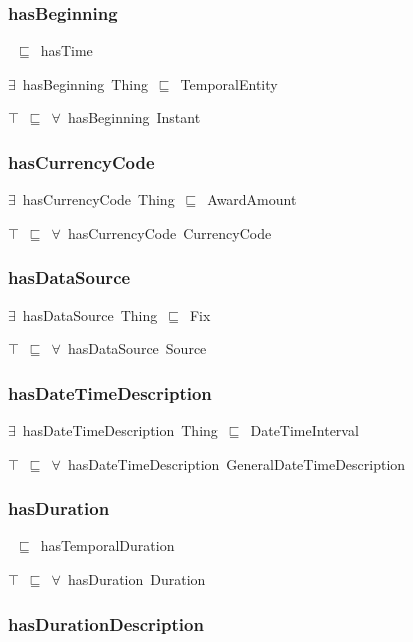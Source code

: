 \documentclass{article}
\begin{document}
\subsubsection*{hasBeginning}

~\ensuremath{\sqsubseteq}~hasTime

\ensuremath{\exists}~hasBeginning~Thing~\ensuremath{\sqsubseteq}~TemporalEntity

\ensuremath{\top}~\ensuremath{\sqsubseteq}~\ensuremath{\forall}~hasBeginning~Instant

\subsubsection*{hasCurrencyCode}

\ensuremath{\exists}~hasCurrencyCode~Thing~\ensuremath{\sqsubseteq}~AwardAmount

\ensuremath{\top}~\ensuremath{\sqsubseteq}~\ensuremath{\forall}~hasCurrencyCode~CurrencyCode

\subsubsection*{hasDataSource}

\ensuremath{\exists}~hasDataSource~Thing~\ensuremath{\sqsubseteq}~Fix

\ensuremath{\top}~\ensuremath{\sqsubseteq}~\ensuremath{\forall}~hasDataSource~Source

\subsubsection*{hasDateTimeDescription}

\ensuremath{\exists}~hasDateTimeDescription~Thing~\ensuremath{\sqsubseteq}~DateTimeInterval

\ensuremath{\top}~\ensuremath{\sqsubseteq}~\ensuremath{\forall}~hasDateTimeDescription~GeneralDateTimeDescription

\subsubsection*{hasDuration}

~\ensuremath{\sqsubseteq}~hasTemporalDuration

\ensuremath{\top}~\ensuremath{\sqsubseteq}~\ensuremath{\forall}~hasDuration~Duration

\subsubsection*{hasDurationDescription}
\end{document}
